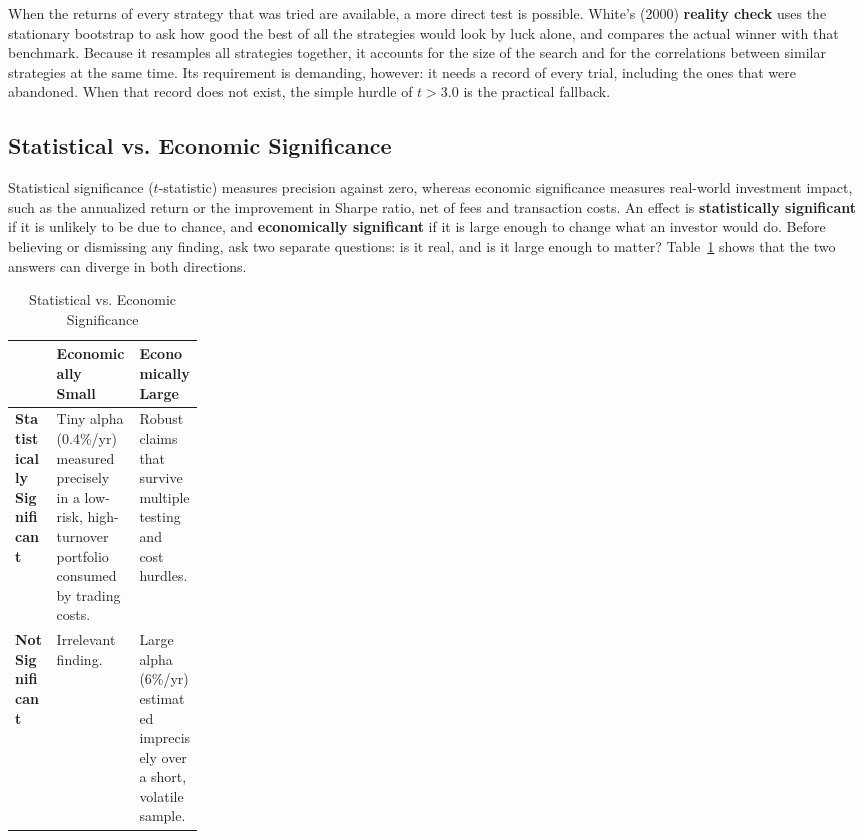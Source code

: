 When the returns of every strategy that was tried are available, a more direct test is possible. White's (2000) \textbf{reality check} uses the stationary bootstrap to ask how good the best of all the strategies would look by luck alone, and compares the actual winner with that benchmark. Because it resamples all strategies together, it accounts for the size of the search and for the correlations between similar strategies at the same time. Its requirement is demanding, however: it needs a record of every trial, including the ones that were abandoned. When that record does not exist, the simple hurdle of $t > 3.0$ is the practical fallback.

\subsection{Statistical vs. Economic Significance}
\label{sec:03-economic}
Statistical significance ($t$-statistic) measures precision against zero, whereas economic significance measures real-world investment impact, such as the annualized return or the improvement in Sharpe ratio, net of fees and transaction costs. An effect is \textbf{statistically significant} if it is unlikely to be due to chance, and \textbf{economically significant} if it is large enough to change what an investor would do. Before believing or dismissing any finding, ask two separate questions: is it real, and is it large enough to matter? Table~\ref{tab:03-stat-econ} shows that the two answers can diverge in both directions.

\begin{table}[htbp]
\centering
\small
\caption{Statistical vs. Economic Significance}
\label{tab:03-stat-econ}
\begin{tabularx}{0.9\linewidth}{@{}>{\raggedright\arraybackslash}p{0.22\linewidth}>{\raggedright\arraybackslash}X>{\raggedright\arraybackslash}X@{}}
\toprule
 & Economically Small & Economically Large \\
\midrule
\textbf{Statistically Significant} & Tiny alpha (0.4\%/yr) measured precisely in a low-risk, high-turnover portfolio consumed by trading costs. & Robust claims that survive multiple testing and cost hurdles. \\
\textbf{Not Significant} & Irrelevant finding. & Large alpha (6\%/yr) estimated imprecisely over a short, volatile sample. \\
\bottomrule
\end{tabularx}
\end{table}

